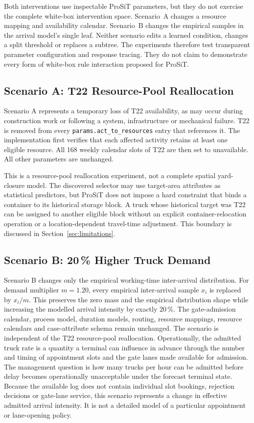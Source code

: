 Both interventions use inspectable ProSiT parameters, but they do not exercise
the complete white-box intervention space. Scenario~A changes a resource
mapping and availability calendar. Scenario~B changes the empirical samples in
the arrival model's single leaf. Neither scenario edits a learned condition,
changes a split threshold or replaces a subtree. The experiments therefore
test transparent parameter configuration and response tracing. They do not
claim to demonstrate every form of white-box rule interaction proposed for
ProSiT.

\subsection{Scenario A: T22 Resource-Pool Reallocation}

Scenario A represents a temporary loss of T22 availability, as may occur during
construction work or following a system, infrastructure or mechanical failure.
T22 is removed from every \texttt{params.act\_to\_resources} entry that
references it. The implementation first verifies that each affected activity
retains at least one eligible resource. All 168 weekly calendar slots of T22
are then set to unavailable. All other parameters are unchanged.

This is a resource-pool reallocation experiment, not a complete
spatial yard-closure model.
The discovered selector may use target-area attributes as statistical
predictors, but ProSiT does not impose a hard constraint that binds a
container to its historical storage block. A truck whose
historical target was T22 can be assigned to another eligible
block without an explicit container-relocation operation or a
location-dependent travel-time adjustment. This boundary is discussed in
Section~\ref{sec:limitations}.

\subsection{Scenario B: 20\,\% Higher Truck Demand}

Scenario B changes only the empirical working-time inter-arrival
distribution. For demand multiplier $m=1.20$, every empirical
inter-arrival sample $x_i$ is replaced by $x_i/m$. This preserves the
zero mass and the empirical distribution shape while increasing the
modelled arrival intensity by exactly 20\,\%. The gate-admission
calendar, process model, duration models, routing, resource mappings,
resource calendars and case-attribute schema remain unchanged. The
scenario is independent of the T22 resource-pool reallocation. Operationally,
the admitted truck rate is a quantity a terminal can influence in advance
through the number and timing of appointment slots and the gate lanes made
available for admission. The management question is how many trucks per hour
can be admitted before delay becomes operationally unacceptable under the
forecast terminal state. Because the available log does not contain individual
slot bookings, rejection decisions or gate-lane service, this scenario
represents a change in effective admitted arrival intensity. It is not a
detailed model of a particular appointment or lane-opening policy.

